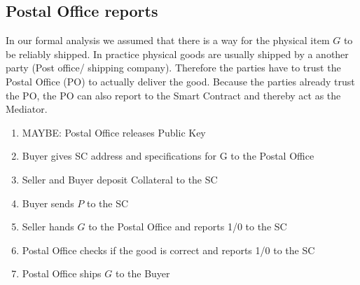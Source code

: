 \documentclass{cacthesis}
\begin{document}
\subsection{Postal Office reports}
In our formal analysis we assumed that there is a way for the physical item $G$ to be reliably shipped. In practice physical goods are usually shipped by a another party (Post office/ shipping company). \newline
Therefore the parties have to trust the Postal Office (PO) to actually deliver the good. Because the parties already trust the PO, the PO can also report to the Smart Contract and thereby act as the Mediator.
\begin{enumerate}
    \item MAYBE: Postal Office releases Public Key
    \item Buyer gives SC address and specifications for G to the Postal Office
    \item Seller and Buyer deposit Collateral to the SC
    \item Buyer sends $P$ to the SC
    \item Seller hands $G$ to the Postal Office and reports 1/0 to the SC
    \item Postal Office checks if the good is correct and reports 1/0 to the SC
    \item Postal Office ships $G$ to the Buyer
\end{enumerate}
\end{document}
